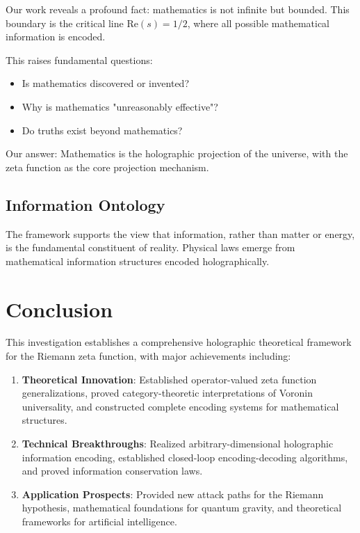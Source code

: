 \documentclass[12pt]{article}
\begin{document}
Our work reveals a profound fact: mathematics is not infinite but bounded. This boundary is the critical line $\text{Re}(s) = 1/2$, where all possible mathematical information is encoded.

This raises fundamental questions:
\begin{itemize}
\item Is mathematics discovered or invented?
\item Why is mathematics "unreasonably effective"?
\item Do truths exist beyond mathematics?
\end{itemize}

Our answer: Mathematics is the holographic projection of the universe, with the zeta function as the core projection mechanism.

\subsection{Information Ontology}

The framework supports the view that information, rather than matter or energy, is the fundamental constituent of reality. Physical laws emerge from mathematical information structures encoded holographically.

\section{Conclusion}

This investigation establishes a comprehensive holographic theoretical framework for the Riemann zeta function, with major achievements including:

\begin{enumerate}
\item \textbf{Theoretical Innovation}: Established operator-valued zeta function generalizations, proved category-theoretic interpretations of Voronin universality, and constructed complete encoding systems for mathematical structures.

\item \textbf{Technical Breakthroughs}: Realized arbitrary-dimensional holographic information encoding, established closed-loop encoding-decoding algorithms, and proved information conservation laws.

\item \textbf{Application Prospects}: Provided new attack paths for the Riemann hypothesis, mathematical foundations for quantum gravity, and theoretical frameworks for artificial intelligence.
\end{enumerate}
\end{document}
